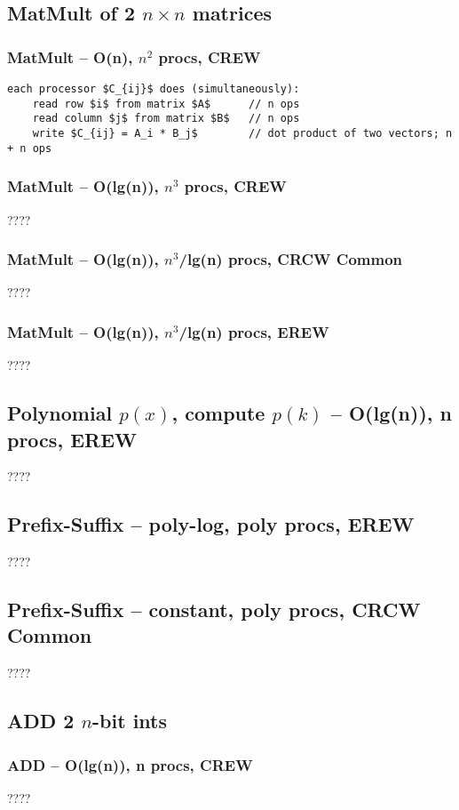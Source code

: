 \documentclass[12pt]{article}
\begin{document}
\subsection{MatMult of 2 $n\times n$ matrices}
\subsubsection{MatMult -- O(n), $n^2$ procs, CREW}
\begin{lstlisting}
each processor $C_{ij}$ does (simultaneously):
    read row $i$ from matrix $A$      // n ops
    read column $j$ from matrix $B$   // n ops
    write $C_{ij} = A_i * B_j$        // dot product of two vectors; n + n ops
\end{lstlisting}
\subsubsection{MatMult -- O(lg(n)), $n^3$ procs, CREW}
????
\subsubsection{MatMult -- O(lg(n)), $n^3$/lg(n) procs, CRCW Common}
????
\subsubsection{MatMult -- O(lg(n)), $n^3$/lg(n) procs, EREW}
????


\subsection{Polynomial $p(x)$, compute $p(k)$ -- O(lg(n)), n procs, EREW}
????


\subsection{Prefix-Suffix -- poly-log, poly procs, EREW}
????


\subsection{Prefix-Suffix -- constant, poly procs, CRCW Common}
????


\subsection{ADD 2 $n$-bit ints}
\subsubsection{ADD -- O(lg(n)), n procs, CREW}
????
\end{document}
